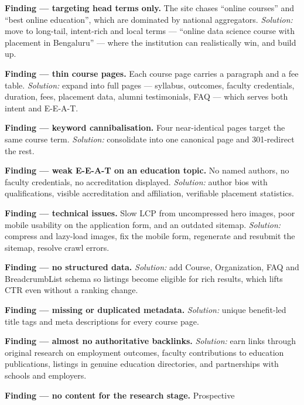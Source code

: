 \begin{qlist}
\begin{apts}
\item \textbf{Finding --- targeting head terms only.} The site chases ``online
      courses'' and ``best online education'', which are dominated by national
      aggregators. \emph{Solution:} move to long-tail, intent-rich and local
      terms --- ``online data science course with placement in Bengaluru'' ---
      where the institution can realistically win, and build up.
\item \textbf{Finding --- thin course pages.} Each course page carries a
      paragraph and a fee table. \emph{Solution:} expand into full pages ---
      syllabus, outcomes, faculty credentials, duration, fees, placement data,
      alumni testimonials, FAQ --- which serves both intent and E-E-A-T.
\item \textbf{Finding --- keyword cannibalisation.} Four near-identical pages
      target the same course term. \emph{Solution:} consolidate into one
      canonical page and 301-redirect the rest.
\item \textbf{Finding --- weak E-E-A-T on an education topic.} No named authors,
      no faculty credentials, no accreditation displayed. \emph{Solution:}
      author bios with qualifications, visible accreditation and affiliation,
      verifiable placement statistics.
\item \textbf{Finding --- technical issues.} Slow LCP from uncompressed hero
      images, poor mobile usability on the application form, and an outdated
      sitemap. \emph{Solution:} compress and lazy-load images, fix the mobile
      form, regenerate and resubmit the sitemap, resolve crawl errors.
\item \textbf{Finding --- no structured data.} \emph{Solution:} add Course,
      Organization, FAQ and BreadcrumbList schema so listings become eligible
      for rich results, which lifts CTR even without a ranking change.
\item \textbf{Finding --- missing or duplicated metadata.} \emph{Solution:}
      unique benefit-led title tags and meta descriptions for every course page.
\item \textbf{Finding --- almost no authoritative backlinks.} \emph{Solution:}
      earn links through original research on employment outcomes, faculty
      contributions to education publications, listings in genuine education
      directories, and partnerships with schools and employers.
\item \textbf{Finding --- no content for the research stage.} Prospective

\end{apts}
\end{qlist}
